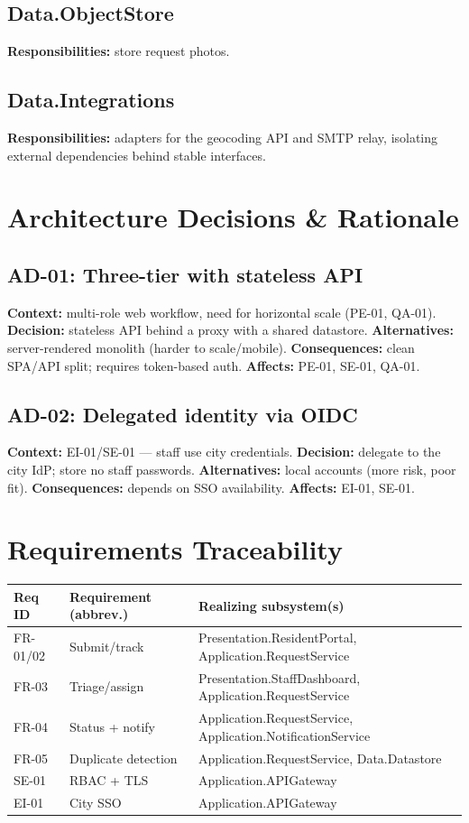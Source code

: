 \documentclass[11pt,letterpaper]{article}
\begin{document}
\subsection{Data.ObjectStore}
\textbf{Responsibilities:} store request photos.
\subsection{Data.Integrations}
\textbf{Responsibilities:} adapters for the geocoding API and SMTP relay, isolating
external dependencies behind stable interfaces.

\section{Architecture Decisions \& Rationale}
\subsection{AD-01: Three-tier with stateless API}
\textbf{Context:} multi-role web workflow, need for horizontal scale (PE-01, QA-01).
\textbf{Decision:} stateless API behind a proxy with a shared datastore.
\textbf{Alternatives:} server-rendered monolith (harder to scale/mobile).
\textbf{Consequences:} clean SPA/API split; requires token-based auth. \textbf{Affects:} PE-01, SE-01, QA-01.
\subsection{AD-02: Delegated identity via OIDC}
\textbf{Context:} EI-01/SE-01 --- staff use city credentials. \textbf{Decision:}
delegate to the city IdP; store no staff passwords. \textbf{Alternatives:} local
accounts (more risk, poor fit). \textbf{Consequences:} depends on SSO availability. \textbf{Affects:} EI-01, SE-01.

\section{Requirements Traceability}
\begin{table}[H]\begin{center}\begin{tabular}{ | p{2cm} | p{5.5cm} | p{5cm} |}\hline
\textbf{Req ID} & \textbf{Requirement (abbrev.)} & \textbf{Realizing subsystem(s)} \\ \hline
FR-01/02 & Submit/track & Presentation.ResidentPortal, Application.RequestService \\ \hline
FR-03 & Triage/assign & Presentation.StaffDashboard, Application.RequestService \\ \hline
FR-04 & Status + notify & Application.RequestService, Application.NotificationService \\ \hline
FR-05 & Duplicate detection & Application.RequestService, Data.Datastore \\ \hline
SE-01 & RBAC + TLS & Application.APIGateway \\ \hline
EI-01 & City SSO & Application.APIGateway \\ \hline
\end{tabular}\end{center}\end{table}


{}
\end{document}
